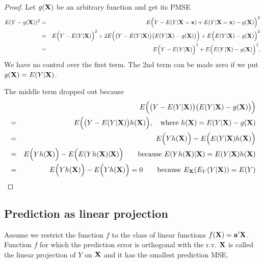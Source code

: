 \begin{proof}
Let $g(\mathbf{X})$ be an arbitrary function and get its PMSE
\begin{eqnarray*}
E (Y - g(\mathbf{X}))^2 & = & E \Big( Y - E(Y|\mathbf{X}=\mathbf{x}) + E(Y|\mathbf{X}=\mathbf{x}) - g(\mathbf{X}) \Big)^2 \\
& =& E \Big( Y - E(Y|\mathbf{X})\Big)^2 + 2 E \Big( \big( Y - E(Y|\mathbf{X}) \big) \big( E(Y|\mathbf{X}) - g(\mathbf{X}) \big) \Big) + E \Big( E(Y|\mathbf{X}) - g(\mathbf{X}) \Big)^2 \\
& =& E \Big( Y - E(Y|\mathbf{X})\Big)^2 + E \Big( E(Y|\mathbf{X}) - g(\mathbf{X}) \Big)^2,
\end{eqnarray*}
We have no control over the first term. The 2nd term can be made zero if we put $g(\mathbf{X}) = E(Y|\mathbf{X})$.

The middle term dropped out because
\begin{eqnarray*}
& & E \Big( \big( Y - E(Y|\mathbf{X}) \big) \big( E(Y|\mathbf{X}) - g(\mathbf{X}) \big) \Big) \\
& = & E \Big( \big( Y - E(Y|\mathbf{X}) \big) h(\mathbf{X}) \Big) , \quad \text{where } h(\mathbf{X}) = E(Y|\mathbf{X}) - g(\mathbf{X}) \\
& = & E \Big( Y h(\mathbf{X}) \Big) - E \Big( E(Y|\mathbf{X}) h(\mathbf{X}) \Big) \\
& = & E \Big( Y h(\mathbf{X}) \Big) - E \Big( E(Y h(\mathbf{X})|\mathbf{X}) \Big) \qquad \text{because } E(Y h(\mathbf{X})|\mathbf{X}) = E(Y|\mathbf{X})h(\mathbf{X})\\
& = & E \Big( Y h(\mathbf{X}) \Big) - E \Big( Y h(\mathbf{X}) \Big) = 0 \qquad \text{because } E_{\mathbf{X}}(E_Y(Y|\mathbf{X})) = E(Y)
\end{eqnarray*}

\end{proof}

\subsection{Prediction as linear projection}\label{sec:LinProject}
Assume we restrict the function $f$ to the class of linear functions $f(\mathbf{X}) = \mathbf{a}' \mathbf{X}$. 
Function $f$ for which the prediction error is orthogonal with the r.v. $\mathbf{X}$ is called the linear projection of $Y$ on $\mathbf{X}$ and it has the smallest prediction MSE.


